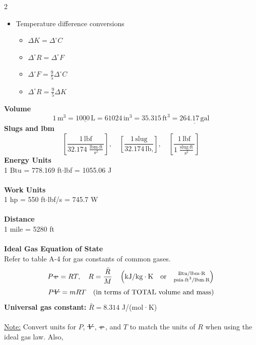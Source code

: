 \documentclass[10pt, fleqn]{article}
\newcommand{\vol}{\mathord{\text{\ooalign{\hidewidth $V$\hidewidth\cr\kern-0.5pt\raisebox{0.8ex}{\rule[0pt]{1em}{0.5pt}}}}}}
\newcommand{\svol}{%
  \mathord{\text{\ooalign{%
    \hfil$v$\hfil\cr
    \hfil\rule[0.6ex]{0.8em}{0.5pt}\hfil
  }}}%
}
\begin{document}
\begin{multicols}{2}
\begin{itemize}[label=\textbullet]
\begin{itemize}[label=\textopenbullet]
        \item $T_{^\circ R} = T_{^\circ F} + 459.67$
        \item $T_{^\circ F} = \frac{9}{5}T_{^\circ C} + 32$
        \item $T_{^\circ R} = \frac{9}{5}T_{K}$
    \end{itemize}
    \item Temperature difference conversions
    \begin{itemize}[label=\textopenbullet]
        \item $\Delta K = \Delta ^\circ C$
        \item $\Delta ^\circ R = \Delta ^\circ F$
        \item $\Delta ^\circ F = \frac{9}{5}\Delta ^\circ C$
        \item $\Delta ^\circ R = \frac{9}{5}\Delta K$
    \end{itemize}
\end{itemize}
\textbf{Volume}
\[1\,\text{m}^3 = \underline{1000\,\text{L}} = 61024\,\text{in}^3 = 35.315\,\text{ft}^3=\underline{264.17\,\text{gal}}\]
\textbf{Slugs and lbm}
\[\left[\frac{1\,\text{lbf}}{32.174\,\frac{\text{lbm}\cdot\text{ft}}{\text{s}^2}}\right],\quad
\left[\frac{1\,\text{slug}}{32.174\,\text{lb,}}\right], \quad
\left[\frac{1\,\text{lbf}}{1\,\frac{\text{slug}\cdot\text{ft}}{\text{s}^2}}\right]\]
\textbf{Energy Units}\\
1 Btu = 778.169 ft$\cdot$lbf = 1055.06 J\\\\
\textbf{Work Units}\\
1 hp = 550 ft$\cdot$lbf/s = 745.7 W\\\\
\textbf{Distance}\\
1 mile = 5280 ft\\\\
\textbf{Ideal Gas Equation of State}\\
Refer to table A-4 for gas constants of common gases.
\[
P \svol = R T, \quad
R = \frac{\bar{R}}{M}\quad
\left(
\mathrm{kJ/kg\cdot K} \quad \text{or}\quad
\substack{
\mathrm{Btu/lbm\cdot R} \\
\mathrm{psia\cdot ft^3/lbm\cdot R}
}
\right)
\]
\[P\vol = mRT \quad \text{(in terms of TOTAL volume and mass)}\]
\textbf{Universal gas constant:}  $\bar{R} = 8.314$ J/(mol·K)\\\\
\underline{Note:} Convert units for $P$, $\vol$, $\svol$, and $T$ to match the units of $R$ when using the ideal gas law. Also,

\end{multicols}
\end{document}

